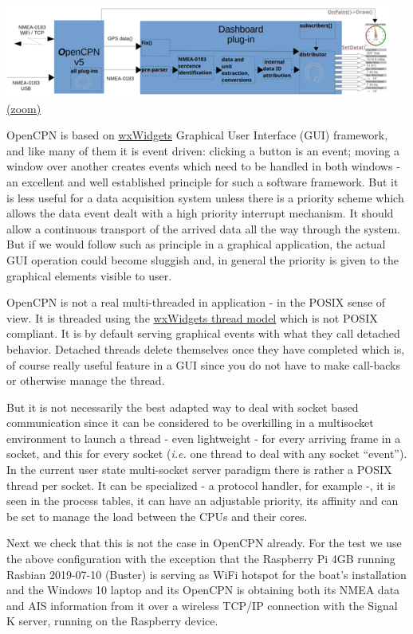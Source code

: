 \documentclass[11pt]{article}
\begin{document}
    \includegraphics{signalkin-instrudiagram-2.png}
\href{img/signalkin-instrudiagram-2.png}{(zoom)}

    OpenCPN is based on \href{https://www.wxwidgets.org/}{wxWidgets}
Graphical User Interface (GUI) framework, and like many of them it is
event driven: clicking a button is an event; moving a window over
another creates events which need to be handled in both windows - an
excellent and well established principle for such a software framework.
But it is less useful for a data acquisition system unless there is a
priority scheme which allows the data event dealt with a high priority
interrupt mechanism. It should allow a continuous transport of the
arrived data all the way through the system. But if we would follow such
as principle in a graphical application, the actual GUI operation could
become sluggish and, in general the priority is given to the graphical
elements visible to user.

    OpenCPN is not a real multi-threaded in application - in the POSIX sense
of view. It is threaded using the
\href{https://docs.wxwidgets.org/trunk/classwx_thread.html}{wxWidgets
thread model} which is not POSIX compliant. It is by default serving
graphical events with what they call detached behavior. Detached threads
delete themselves once they have completed which is, of course really
useful feature in a GUI since you do not have to make call-backs or
otherwise manage the thread.

    But it is not necessarily the best adapted way to deal with socket based
communication since it can be considered to be overkilling in a
multisocket environment to launch a thread - even lightweight - for
every arriving frame in a socket, and this for every socket (\emph{i.e.}
one thread to deal with any socket ``event''). In the current user state
multi-socket server paradigm there is rather a POSIX thread per socket.
It can be specialized - a protocol handler, for example -, it is seen in
the process tables, it can have an adjustable priority, its affinity and
can be set to manage the load between the CPUs and their cores.

    Next we check that this is not the case in OpenCPN already. For the test
we use the above configuration with the exception that the Raspberry Pi
4GB running Rasbian 2019-07-10 (Buster) is serving as WiFi hotspot for
the boat's installation and the Windows 10 laptop and its OpenCPN is
obtaining both its NMEA data and AIS information from it over a wireless
TCP/IP connection with the Signal K server, running on the Raspberry
device.
\end{document}

